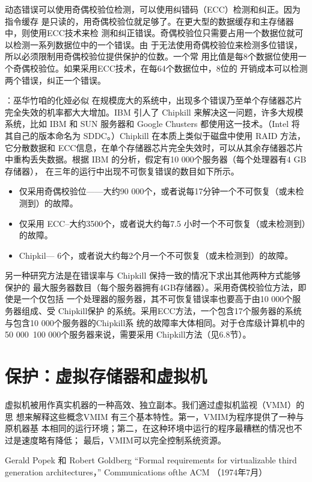 动态错误可以使用奇偶校验位检测，可以使用纠错码（ECC）检测和纠正。因为指令缓存
是只读的，用奇偶校验位就足够了。在更大型的数据缓存和主存储器中，则使用ECC技术来检
测和纠正错误。奇偶校验位只需要占用一个数据位就可以检测一系列数据位中的一个错误。由
于无法使用奇偶校验位来检测多位错误，所以必须限制用奇偶校验位提供保护的位数。一个常
用比值是每8个数据位使用一个奇偶校验位。如果采用ECC技术，在每64个数据位中，8位的
开销成本可以检测两个错误，纠正一个错误。

：巫华竹咱的化娅必似
在规模庞大的系统中，出现多个错误乃至单个存储器芯片完全失效的机率都大大增加。IBM
引人了 Chipkill 来解决这一问题，许多大规模系统，比如 IBM 和 SUN 服务器和 Google Chusters
都使用这一技术。（Intel 将其自己的版本命名为 SDDC。）Chipkill 在本质上类似于磁盘中使用
RAID 方法，它分散数据和 ECC信息，在单个存储器芯片完全失效时，可以从其余存储器芯片
中重构丢失数据。根据 IBM 的分析，假定有10 000个服务器（每个处理器有4 GB 存储器），
在三年的运行中出现不可恢复错误的数目如下所示。

\begin{itemize}
    \item 仅采用奇偶校验位——大约90 000个，或者说每17分钟一个不可恢复（或未检测到）的故障。
    \item 仅采用 ECC--大约3500个，或者说大约每7.5 小时一个不可恢复（或未检测到）的故障。
    \item Chipkil— 6个，或者说大约每2个月一个不可恢复（或未检测到）的故障。
\end{itemize}

另一种研究方法是在错误率与 Chipkill 保持一致的情况下求出其他两种方式能够保护的
最大服务器数目（每个服务器拥有4GB存储器）。采用奇偶校验位方法，即使是一个仅包括
一个处理器的服务器，其不可恢复错误率也要高于由10 000个服务器组成、受 Chipkill保护
的系统。采用ECC方法，一个包含17个服务器的系统与包含10 000个服务器的Chipkill系
统的故障率大体相同。对于仓库级计算机中的50 000~100 000个服务器来说，需要采用
Chipkill方法（见6.8节）。
\section{保护：虚拟存储器和虚拟机}
虚拟机被用作真实机器的一种高效、独立副本。我们適过虚拟机监视（VMM）的思
想来解释这些概念VMIM 有三个基本特性。第一，VMIM为程序提供了一种与原机器基
本相同的运行环境；第二，在这种环境中运行的程序最糟糕的情况也不过是速度略有降低；
最后，VMIM可以完全控制系统资源。

Gerald Popek 和 Robert Goldberg
“Formal requirements for virtualizable third generation architectures，”
Communications ofthe ACM （1974年7月）

